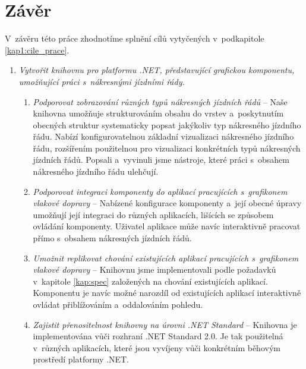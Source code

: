 \chapter*{Závěr}

V~závěru této práce zhodnotíme splnění cílů vytyčených v~podkapitole \ref{kap1:cile_prace}.

\begin{enumerate}[label=\color{goalcolor}\textbf{G{\arabic*}}]
	\item \textit{Vytvořit knihovnu pro platformu .NET, představující grafickou komponentu, umožňující práci s~nákresnými jízdními řády.}
	\begin{enumerate}[label=\color{goalcolor}\textbf{\alph*})]
		\item \textit{Podporovat zobrazování různých typů nákresných jízdních řádů} -- Naše knihovna umožňuje strukturováním obsahu do vrstev a~poskytnutím obecných struktur systematicky popsat jakýkoliv typ nákresného jízdního řádu. Nabízí konfigurovatelnou základní vizualizaci nákresného jízdního řádu, rozšířením použitelnou pro vizualizaci konkrétních typů nákresných jízdních řádů. Popsali a~vyvinuli jsme nástroje, které práci s~obsahem nákresného jízdního řádu ulehčují.
		\item \textit{Podporovat integraci komponenty do aplikací pracujících s~grafikonem vlakové dopravy} -- Nabízené konfigurace komponenty a~její obecné úpravy umožňují její integraci do různých aplikacích, lišících se způsobem ovládání komponenty. Uživatel aplikace může navíc interaktivně pracovat přímo s~obsahem nákresných jízdních řádů.
		\item \textit{Umožnit replikovat chování existujících aplikací pracujících s~grafikonem vlakové dopravy} -- Knihovnu jsme implementovali podle požadavků v~kapitole \ref{kap:spec} založených na chování existujících aplikací. Komponentu je navíc možné narozdíl od existujících aplikací interaktivně ovládat přiblížováním a~oddalováním pohledu.
		\item \textit{Zajistit přenositelnost knihovny na úrovni .NET Standard} -- Knihovna je implementována vůči rozhraní .NET Standard 2.0. Je tak použitelná v~různých aplikacích, které jsou vyvíjeny vůči konkrétním běhovým prostředí platformy .NET.
	\end{enumerate}	


\end{enumerate}
